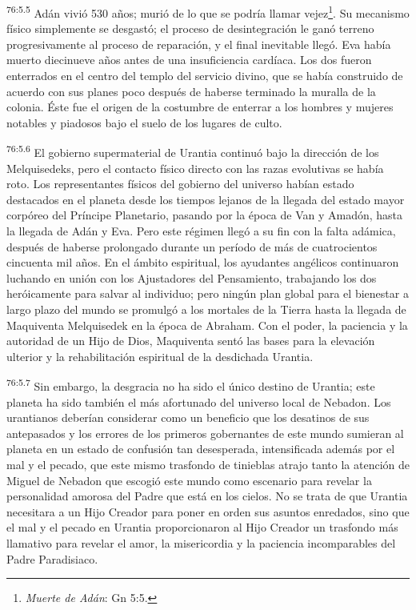 \par
\textsuperscript{76:5.5} Adán vivió 530 años; murió de lo que se podría llamar vejez\footnote{\textit{Muerte de Adán}: Gn 5:5.}. Su mecanismo físico simplemente se desgastó; el proceso de desintegración le ganó terreno progresivamente al proceso de reparación, y el final inevitable llegó. Eva había muerto diecinueve años antes de una insuficiencia cardíaca. Los dos fueron enterrados en el centro del templo del servicio divino, que se había construido de acuerdo con sus planes poco después de haberse terminado la muralla de la colonia. Éste fue el origen de la costumbre de enterrar a los hombres y mujeres notables y piadosos bajo el suelo de los lugares de culto.

\par
\textsuperscript{76:5.6} El gobierno supermaterial de Urantia continuó bajo la dirección de los Melquisedeks, pero el contacto físico directo con las razas evolutivas se había roto. Los representantes físicos del gobierno del universo habían estado destacados en el planeta desde los tiempos lejanos de la llegada del estado mayor corpóreo del Príncipe Planetario, pasando por la época de Van y Amadón, hasta la llegada de Adán y Eva. Pero este régimen llegó a su fin con la falta adámica, después de haberse prolongado durante un período de más de cuatrocientos cincuenta mil años. En el ámbito espiritual, los ayudantes angélicos continuaron luchando en unión con los Ajustadores del Pensamiento, trabajando los dos heróicamente para salvar al individuo; pero ningún plan global para el bienestar a largo plazo del mundo se promulgó a los mortales de la Tierra hasta la llegada de Maquiventa Melquisedek en la época de Abraham. Con el poder, la paciencia y la autoridad de un Hijo de Dios, Maquiventa sentó las bases para la elevación ulterior y la rehabilitación espiritual de la desdichada Urantia.

\par
\textsuperscript{76:5.7} Sin embargo, la desgracia no ha sido el único destino de Urantia; este planeta ha sido también el más afortunado del universo local de Nebadon. Los urantianos deberían considerar como un beneficio que los desatinos de sus antepasados y los errores de los primeros gobernantes de este mundo sumieran al planeta en un estado de confusión tan desesperada, intensificada además por el mal y el pecado, que este mismo trasfondo de tinieblas atrajo tanto la atención de Miguel de Nebadon que escogió este mundo como escenario para revelar la personalidad amorosa del Padre que está en los cielos. No se trata de que Urantia necesitara a un Hijo Creador para poner en orden sus asuntos enredados, sino que el mal y el pecado en Urantia proporcionaron al Hijo Creador un trasfondo más llamativo para revelar el amor, la misericordia y la paciencia incomparables del Padre Paradisiaco.

